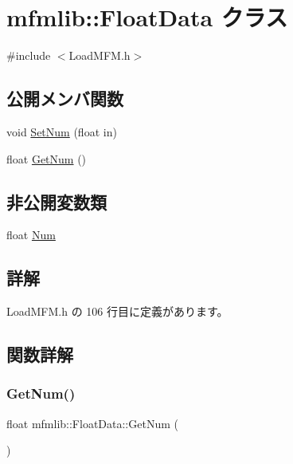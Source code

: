 \hypertarget{classmfmlib_1_1_float_data}{}\section{mfmlib\+:\+:Float\+Data クラス}
\label{classmfmlib_1_1_float_data}


{\ttfamily \#include $<$Load\+M\+F\+M.\+h$>$}

\subsection*{公開メンバ関数}
\begin{DoxyCompactItemize}
\item 
void \mbox{\hyperlink{classmfmlib_1_1_float_data_a7c74124a56e159cdb8e9b540833daac2}{Set\+Num}} (float in)
\item 
float \mbox{\hyperlink{classmfmlib_1_1_float_data_a9abfe9174f63eea4a58668945adecd19}{Get\+Num}} ()
\end{DoxyCompactItemize}
\subsection*{非公開変数類}
\begin{DoxyCompactItemize}
\item 
float \mbox{\hyperlink{classmfmlib_1_1_float_data_a3064dd32941160b19e6d2b6270119690}{Num}}
\end{DoxyCompactItemize}


\subsection{詳解}


 Load\+M\+F\+M.\+h の 106 行目に定義があります。



\subsection{関数詳解}
\mbox{\label{classmfmlib_1_1_float_data_a9abfe9174f63eea4a58668945adecd19}} 
\subsubsection{\texorpdfstring{Get\+Num()}{GetNum()}}
{\footnotesize\ttfamily float mfmlib\+::\+Float\+Data\+::\+Get\+Num (\begin{DoxyParamCaption}{ }\end{DoxyParamCaption})\hspace{0.3cm}{\ttfamily [inline]}}



